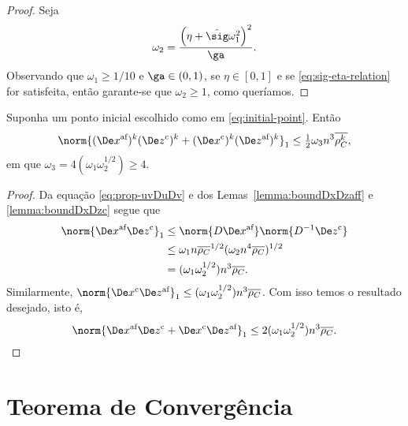 \begin{proof}
Seja
\begin{equation}
\label{eq:omega2}
	\omega_2 = \frac{\left(\eta +{\nextsig} \omega_1^{2} \right)^{2}}{\ga}.
	\end{equation}
Observando que  $\omega_1 \geq 1/10$ e  $\ga\in(0,1)$,  se $\eta\in[0,1]$ e se \eqref{eq:sig-eta-relation} for satisfeita, então garante-se que $\omega_2\geq 1$, como queríamos. \qedhere





\end{proof}

\begin{lema}\label{lemma:boundDxDzaff-c}
	Suponha um ponto inicial escolhido como em \eqref{eq:initial-point}. Então 
	\begin{equation}\label{eq:lemma-boundDxDzaff-c}
		\norm{(\dex)^{k}(\Decoz)^{k} + (\Decox)^{k}(\dez)^{k}}_{1} \leq  \tfrac{1}{2}\omega_{3}n^{3}\dbvec{\rho_C^{k}},
	\end{equation}
em que $\omega_{3} = 4(\omega_1\omega_2^{1/2})\geq 4 $.
\end{lema}

\begin{proof}
	Da equação \eqref{eq:prop-uvDuDv} e dos Lemas~\ref{lemma:boundDxDzaff} e \ref{lemma:boundDxDzc} segue que  
	\begin{align*}	
		\norm{\dex\Decoz}_{1} & \leq \norm{D\dex}\norm{D^{-1}\Decoz}\\
							  & \leq 	\omega_1 n\dbvec{\rho_C}^{1/2}(\omega_2 n^{4}\dbvec{\rho_C})^{1/2}  \\
							  & = (\omega_1\omega_2^{1/2})n^{3}\dbvec{\rho_C}.
	\end{align*}			  
Similarmente, 	$\norm{\Decox\dez}_{1} \leq (\omega_1\omega_2^{1/2})n^{3}\dbvec{\rho_C}$. Com isso temos o resultado desejado, isto é,
\[
		\norm{\dex\Decoz + \Decox\dez}_{1} \leq 2(\omega_1\omega_2^{1/2})n^{3}\dbvec{\rho_C}.\qedhere
\]
\end{proof}

\section{Teorema de Convergência}

